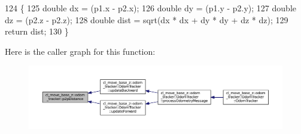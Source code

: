 \begin{DoxyCode}
124 \{
125     \textcolor{keywordtype}{double} dx = (p1.x - p2.x);
126     \textcolor{keywordtype}{double} dy = (p1.y - p2.y);
127     \textcolor{keywordtype}{double} dz = (p2.z - p2.z);
128     \textcolor{keywordtype}{double} dist = sqrt(dx * dx + dy * dy + dz * dz);
129     \textcolor{keywordflow}{return} dist;
130 \}
\end{DoxyCode}


Here is the caller graph for this function\+:
\nopagebreak
\begin{figure}[H]
\begin{center}
\leavevmode
\includegraphics[width=350pt]{namespacecl__move__base__z_1_1odom__tracker_a501582a760a02ce0069d95bfc67ca973_icgraph}
\end{center}
\end{figure}


